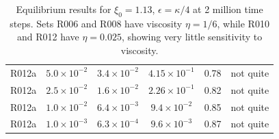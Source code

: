 \begin{table}
\begin{center}
\begin{tabular}{|c|c|c|c|c|c|}
R012a & $5.0\times 10^{-2}$ & $3.4\times 10^{-2}$ & $4.15\times10^{-1}$
      & 0.78 &  not quite\\
R012a & $2.5\times 10^{-2}$ & $1.6\times 10^{-2}$ & $2.26\times10^{-1}$
      & 0.82 &  not quite\\
R012a & $1.0\times 10^{-2}$ & $6.4\times 10^{-3}$ & $9.4\times10^{-2}$
      & 0.85 & not quite \\
R012a & $1.0\times 10^{-3}$ & $6.3\times 10^{-4}$ & $9.6\times10^{-3}$
      & 0.87 &  not quite\\
\hline
\end{tabular}
\label{table:xi113}
\caption{Equilibrium results for $\xi_0 = 1.13$, $\epsilon = \kappa/4$
at 2 million time steps.
Sets R006 and R008 have viscosity $\eta = 1/6$, while R010 and R012
have $\eta = 0.025$, showing very little sensitivity to viscosity.}
\end{center}
\end{table}



